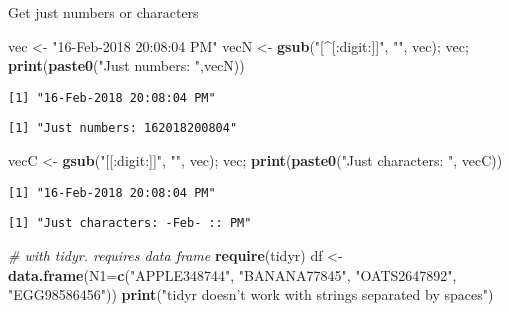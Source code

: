 \documentclass[10,portrait]{article}
\newenvironment{Shaded}{\begin{snugshade}}{\end{snugshade}}
\newcommand{\KeywordTok}[1]{\textcolor[rgb]{0.13,0.29,0.53}{\textbf{#1}}}
\newcommand{\DataTypeTok}[1]{\textcolor[rgb]{0.13,0.29,0.53}{#1}}
\newcommand{\StringTok}[1]{\textcolor[rgb]{0.31,0.60,0.02}{#1}}
\newcommand{\CommentTok}[1]{\textcolor[rgb]{0.56,0.35,0.01}{\textit{#1}}}
\newcommand{\NormalTok}[1]{#1}
\begin{document}
Get just numbers or characters

\begin{Shaded}
\begin{Highlighting}[]
\NormalTok{vec <-}\StringTok{ "16-Feb-2018 20:08:04 PM"}
\NormalTok{vecN <-}\StringTok{ }\KeywordTok{gsub}\NormalTok{(}\StringTok{"[^[:digit:]]"}\NormalTok{, }\StringTok{""}\NormalTok{, vec); vec; }\KeywordTok{print}\NormalTok{(}\KeywordTok{paste0}\NormalTok{(}\StringTok{"Just numbers: "}\NormalTok{,vecN)) }
\end{Highlighting}
\end{Shaded}

\begin{verbatim}
[1] "16-Feb-2018 20:08:04 PM"
\end{verbatim}

\begin{verbatim}
[1] "Just numbers: 162018200804"
\end{verbatim}

\begin{Shaded}
\begin{Highlighting}[]
\NormalTok{vecC <-}\StringTok{ }\KeywordTok{gsub}\NormalTok{(}\StringTok{"[[:digit:]]"}\NormalTok{, }\StringTok{""}\NormalTok{, vec); vec; }\KeywordTok{print}\NormalTok{(}\KeywordTok{paste0}\NormalTok{(}\StringTok{"Just characters: "}\NormalTok{, vecC))}
\end{Highlighting}
\end{Shaded}

\begin{verbatim}
[1] "16-Feb-2018 20:08:04 PM"
\end{verbatim}

\begin{verbatim}
[1] "Just characters: -Feb- :: PM"
\end{verbatim}

\begin{Shaded}
\begin{Highlighting}[]
\CommentTok{# with tidyr. requires data frame }
\KeywordTok{require}\NormalTok{(tidyr)}
\NormalTok{df <-}\StringTok{ }\KeywordTok{data.frame}\NormalTok{(}\DataTypeTok{N1=}\KeywordTok{c}\NormalTok{(}\StringTok{"APPLE348744"}\NormalTok{, }\StringTok{"BANANA77845"}\NormalTok{, }\StringTok{"OATS2647892"}\NormalTok{, }\StringTok{"EGG98586456"}\NormalTok{))}
\KeywordTok{print}\NormalTok{(}\StringTok{"tidyr doesn't work with strings separated by spaces"}\NormalTok{)  }
\end{Highlighting}
\end{Shaded}
\end{document}
